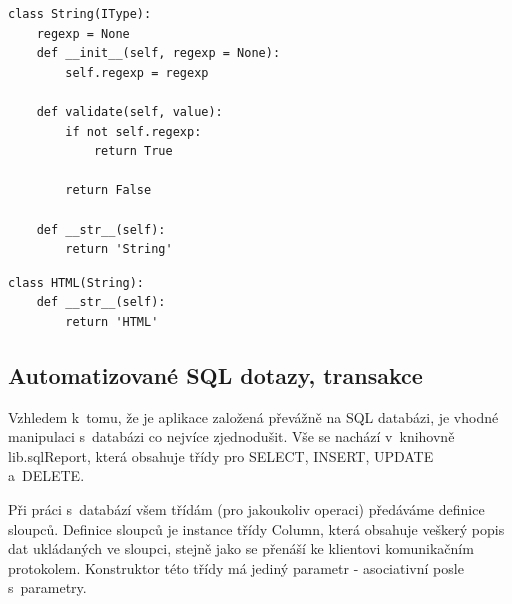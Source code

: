 \documentclass[bc,male,html,dept460]{diploma}				%
\begin{document}
\bigskip
\begin{lstlisting}[label=src:Python,caption=Ukázka implementace datového typu]
class String(IType):
	regexp = None
	def __init__(self, regexp = None):
		self.regexp = regexp

	def validate(self, value):
		if not self.regexp:
			return True

		return False

	def __str__(self):
		return 'String'

\end{lstlisting}

\begin{lstlisting}[label=src:Python,caption=Dědičnost datového typu]
class HTML(String):
	def __str__(self):
		return 'HTML'
\end{lstlisting}
                

\newpage
\subsection{Automatizované SQL dotazy, transakce}
\label{sec:sql}
Vzhledem k~tomu, že je aplikace založená převážně na SQL databázi, je vhodné manipulaci s~databázi co nejvíce zjednodušit. Vše se nachází v~knihovně lib.sqlReport, která obsahuje třídy pro SELECT, INSERT, UPDATE a~DELETE.

Při práci s~databází všem třídám (pro jakoukoliv operaci) předáváme definice sloupců.
Definice sloupců je instance třídy Column, která obsahuje veškerý popis dat ukládaných ve sloupci, stejně jako se přenáší ke klientovi komunikačním protokolem.
Konstruktor této třídy má jediný parametr - asociativní posle s~parametry.
\end{document}
